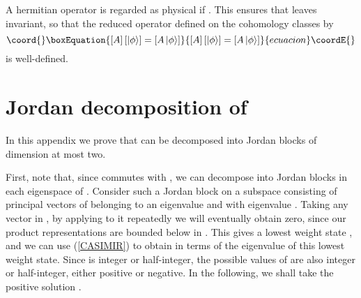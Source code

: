 \documentclass[a4paper,dvips,12pt]{article}
\providecommand {\ket}[1] {\left| #1 \right>}
\providecommand {\im} {\mathrm{im}\,}
\begin{document}
    A hermitian operator \coordHE{} is regarded as physical if \coordHE{}.  This ensures that \coordHE{} leaves \myHighlight{$\im Q$}\coordHE{} invariant, so that
    the reduced operator \myHighlight{$[A]$}\coordHE{} defined on the cohomology classes by
    \begin{equation}\coord{}\boxEquation{
        [A]\,[\ket{\phi}] = [A\ket{\phi}]   \label{AREDUCED}
    }{
        [A]\,[\ket{\phi}] = [A\ket{\phi}]   }{ecuacion}\coordE{}\end{equation}
    is well-defined.

    \section{Jordan decomposition of \coordHE{}}
    \label{J2ANALYSIS}

    In this appendix we prove that \coordHE{} can be decomposed
    into Jordan blocks of dimension at most two.

    First, note that, since \coordHE{} commutes with \coordHE{},
    we can decompose \coordHE{} into Jordan blocks in each
    eigenspace of \coordHE{}.  Consider such a Jordan block on a subspace
    \coordHE{} consisting of
    principal vectors of \coordHE{} belonging to an eigenvalue
    \coordHE{} and with
    \coordHE{} eigenvalue \coordHE{}.  Taking any vector \coordHE{} in \coordHE{},
    by applying \coordHE{} to it repeatedly we will eventually obtain
    zero, since our product representations are bounded below in
    \coordHE{}.  This gives a lowest weight state \coordHE{}, and we can
    use (\ref{CASIMIR}) to obtain \coordHE{} in terms of the \coordHE{} eigenvalue
    \coordHE{} of this
    lowest weight state.  Since \coordHE{} is integer or half-integer,
    the possible values of \coordHE{} are also integer or
    half-integer, either positive or negative.  In the following,
    we shall take the positive solution \coordHE{}.
\end{document}
